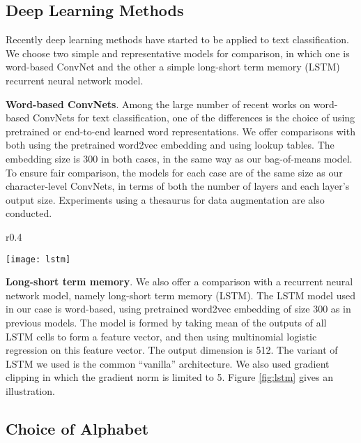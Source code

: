 \documentclass{article} \usepackage{nips15submit_e,times}
\newenvironment{centerverbatim}{\par
  \centering
  \varwidth{\linewidth}\verbatim
}{\endverbatim
  \endvarwidth
  \par
}
\begin{document}
\begin{centerverbatim}
\subsection{Deep Learning Methods}

Recently deep learning methods have started to be applied to text classification. We choose two simple and representative models for comparison, in which one is word-based ConvNet and the other a simple long-short term memory (LSTM)\cite{HS97} recurrent neural network model.

\textbf{Word-based ConvNets}. Among the large number of recent works on word-based ConvNets for text classification, one of the differences is the choice of using pretrained or end-to-end learned word representations. We offer comparisons with both using the pretrained word2vec\cite{MSCCD13} embedding\cite{K14} and using lookup tables\cite{CWB11}. The embedding size is 300 in both cases, in the same way as our bag-of-means model. To ensure fair comparison, the models for each case are of the same size as our character-level ConvNets, in terms of both the number of layers and each layer's output size. Experiments using a thesaurus for data augmentation are also conducted.

\begin{wrapfigure}{r}{0.4\textwidth}
  \begin{center}
    \texttt{[image: lstm]}
  \end{center}
  \caption{long-short term memory}
  \label{fig:lstm}
\end{wrapfigure}

\textbf{Long-short term memory}. We also offer a comparison with a recurrent neural network model, namely long-short term memory (LSTM)\cite{HS97}. The LSTM model used in our case is word-based, using pretrained word2vec embedding of size 300 as in previous models. The model is formed by taking mean of the outputs of all LSTM cells to form a feature vector, and then using multinomial logistic regression on this feature vector. The output dimension is 512. The variant of LSTM we used is the common ``vanilla'' architecture\cite{GS05}\cite{GSKSS15}. We also used gradient clipping\cite{PMB13} in which the gradient norm is limited to 5. Figure \ref{fig:lstm} gives an illustration.

\subsection{Choice of Alphabet}


\end{centerverbatim}
\end{document}
